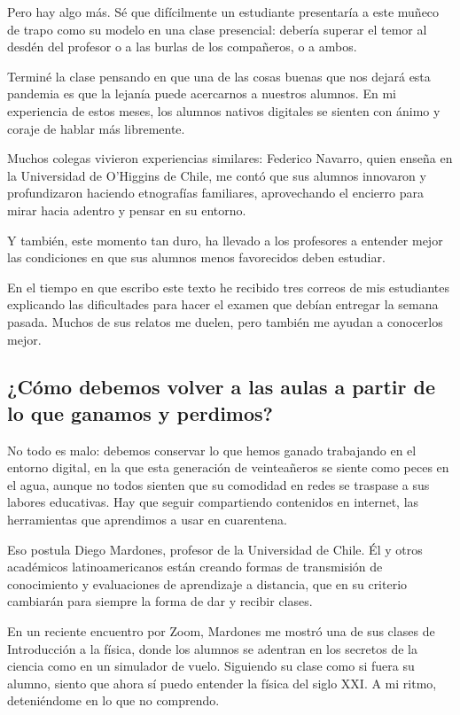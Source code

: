 Pero hay algo más. Sé que difícilmente un estudiante presentaría a este
muñeco de trapo como su modelo en una clase presencial: debería superar
el temor al desdén del profesor o a las burlas de los compañeros, o a
ambos.

Terminé la clase pensando en que una de las cosas buenas que nos dejará
esta pandemia es que la lejanía puede acercarnos a nuestros alumnos. En
mi experiencia de estos meses, los alumnos nativos digitales se sienten
con ánimo y coraje de hablar más libremente.

Muchos colegas vivieron experiencias similares: Federico Navarro, quien
enseña en la Universidad de O'Higgins de Chile, me contó que sus alumnos
innovaron y profundizaron haciendo etnografías familiares, aprovechando
el encierro para mirar hacia adentro y pensar en su entorno.

Y también, este momento tan duro, ha llevado a los profesores a entender
mejor las condiciones en que sus alumnos menos favorecidos deben
estudiar.

En el tiempo en que escribo este texto he recibido tres correos de mis
estudiantes explicando las dificultades para hacer el examen que debían
entregar la semana pasada. Muchos de sus relatos me duelen, pero también
me ayudan a conocerlos mejor.

\hypertarget{cuxf3mo-debemos-volver-a-las-aulas-a-partir-de-lo-que-ganamos-y-perdimos}{%
\subsection{¿Cómo debemos volver a las aulas a partir de lo que ganamos
y
perdimos?}\label{cuxf3mo-debemos-volver-a-las-aulas-a-partir-de-lo-que-ganamos-y-perdimos}}

No todo es malo: debemos conservar lo que hemos ganado trabajando en el
entorno digital, en la que esta generación de veinteañeros se siente
como peces en el agua, aunque no todos sienten que su comodidad en redes
se traspase a sus labores educativas. Hay que seguir compartiendo
contenidos en internet, las herramientas que aprendimos a usar en
cuarentena.

Eso postula Diego Mardones, profesor de la Universidad de Chile. Él y
otros académicos latinoamericanos están creando formas de transmisión de
conocimiento y evaluaciones de aprendizaje a distancia, que en su
criterio cambiarán para siempre la forma de dar y recibir clases.

En un reciente encuentro por Zoom, Mardones me mostró una de sus clases
de Introducción a la física, donde los alumnos se adentran en los
secretos de la ciencia como en un simulador de vuelo. Siguiendo su clase
como si fuera su alumno, siento que ahora sí puedo entender la física
del siglo XXI. A mi ritmo, deteniéndome en lo que no comprendo.


